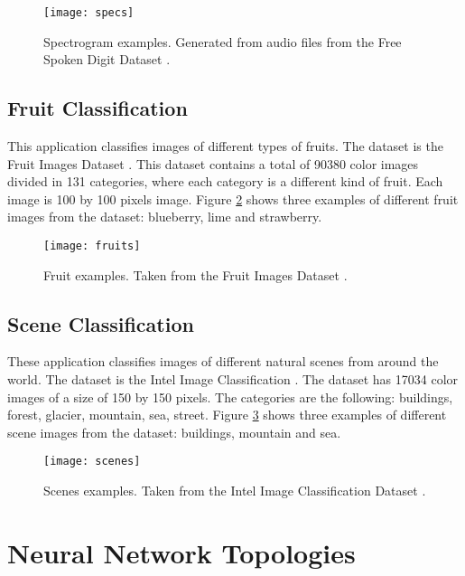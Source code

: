\begin{figure}[thbp]
	\centering
	\texttt{[image: specs]}
	\caption[Spectrogram examples. Generated from audio files from the Free Spoken Digit Dataset.]{Spectrogram examples. Generated from audio files from the Free Spoken Digit Dataset \cite{fsdd}.}
	\label{fig:specs}
\end{figure}

\subsection{Fruit Classification}

This application classifies images of different types of fruits. The dataset is the Fruit Images Dataset \cite{fruit_ds}. This dataset contains a total of 90380 color images divided in 131 categories, where each category is a different kind of fruit. Each image is 100 by 100 pixels image. Figure \ref{fig:fruits} shows three examples of different fruit images from the dataset: blueberry, lime and strawberry.

\begin{figure}[thbp]
	\centering
	\texttt{[image: fruits]}
	\caption[Fruit examples. Taken from the Fruit Images Dataset.]{Fruit examples. Taken from the Fruit Images Dataset \cite{fruit_ds}.}
	\label{fig:fruits}
\end{figure}

\subsection{Scene Classification}

These application classifies images of different natural scenes from around the world. The dataset is the Intel Image Classification \cite{intel_ds}. The dataset has 17034 color images of a size of 150 by 150 pixels. The categories are the following: buildings, forest, glacier, mountain, sea, street. Figure \ref{fig:scenes} shows three examples of different scene images from the dataset: buildings, mountain and sea.

\begin{figure}[thbp]
	\centering
	\texttt{[image: scenes]}
	\caption[Scenes examples. Taken from the Intel Image Classification Dataset.]{Scenes examples. Taken from the Intel Image Classification Dataset \cite{intel_ds}.}
	\label{fig:scenes}
\end{figure}

\section{Neural Network Topologies}

